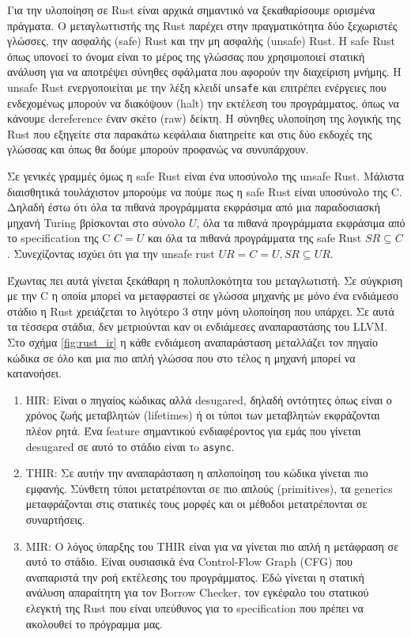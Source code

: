
Για την υλοποίηση σε Rust είναι αρχικά σημαντικό να ξεκαθαρίσουμε ορισμένα
πράγματα. Ο μεταγλωττιστής της Rust παρέχει στην πραγματικότητα δύο ξεχωριστές
γλώσσες, την ασφαλής (safe) Rust και την μη ασφαλής (unsafe) Rust. Η safe Rust
όπως υπονοεί το όνομα είναι το μέρος της γλώσσας που χρησιμοποιεί στατική ανάλυση
για να αποτρέψει σύνηθες σφάλματα που αφορούν την διαχείριση μνήμης. Η unsafe Rust
ενεργοποιείται με την λέξη κλειδί \verb|unsafe| και επιτρέπει ενέργειες που ενδεχομένως
μπορούν να διακόψουν (halt) την εκτέλεση του προγράμματος, όπως να κάνουμε dereference έναν
σκέτο (raw) δείκτη. Η σύνηθες υλοποίηση της λογικής της Rust που εξηγείτε στα παρακάτω κεφάλαια
διατηρείτε και στις δύο εκδοχές της γλώσσας και όπως θα δούμε μπορούν προφανώς να συνυπάρχουν.

Σε γενικές γραμμές όμως η safe Rust είναι ένα υποσύνολο της unsafe Rust. Μάλιστα διαισθητικά
τουλάχιστον μπορούμε να πούμε πως η safe Rust είναι υποσύνολο της C. Δηλαδή έστω ότι όλα τα πιθανά
προγράμματα εκφράσιμα από μια παραδοσιασκή μηχανή Turing βρίσκονται στο σύνολο $U$, όλα τα πιθανά
προγράμματα εκφράσιμα από το specification της C $C=U$ και όλα τα πιθανά προγράμματα της safe Rust $SR \subseteq C$.
Συνεχίζοντας ισχύει ότι για την unsafe rust $UR=C=U, SR \subseteq UR$. 

Έχωντας πει αυτά γίνεται ξεκάθαρη η πολυπλοκότητα του μεταγλωτιστή. Σε σύγκριση με την C η οποία 
μπορεί να μεταφραστεί σε γλώσσα μηχανής με μόνο ένα ενδιάμεσο στάδιο η Rust χρειάζεται το λιγότερο 3
στην μόνη υλοποίηση που υπάρχει. Σε αυτά τα τέσσερα στάδια, δεν μετριούνται καν οι ενδιάμεσες αναπαραστάσης
του LLVM. Στο σχήμα \ref{fig:rust_ir} η κάθε ενδιάμεση αναπαράσταση μεταλλάζει τον πηγαίο κώδικα σε όλο και
μια πιο απλή γλώσσα που στο τέλος η μηχανή μπορεί να κατανοήσει.

\begin{enumerate}
\item HIR: Είναι ο πηγαίος κώδικας αλλά desugared, δηλαδή οντότητες όπως είναι ο χρόνος
  ζωής μεταβλητών (lifetimes) ή οι τύποι των μεταβλητών εκφράζονται πλέον ρητά. Ένα
  feature σημαντικού ενδιαφέροντος για εμάς που γίνεται desugared σε αυτό το στάδιο είναι τo
  \verb|async|.
\item THIR: Σε αυτήν την αναπαράσταση η απλοποίηση του κώδικα γίνεται πιο εμφανής. Σύνθετη
  τύποι μετατρέπονται σε πιο απλούς (primitives), τα generics μεταφράζονται στις στατικές τους
  μορφές και οι μέθοδοι μετατρέπονται σε συναρτήσεις.
\item MIR: Ο λόγος ύπαρξης του THIR είναι για να γίνεται πιο απλή η μετάφραση σε αυτό το στάδιο.
  Είναι ουσιασικά ένα Control-Flow Graph (CFG) που αναπαριστά την ροή εκτέλεσης του προγράμματος.
  Εδώ γίνεται η στατική ανάλυση απαραίτητη για τον Borrow Checker, τον εγκέφαλο του στατικού ελεγκτή
  της Rust που είναι υπεύθυνος για το specification που πρέπει να ακολουθεί το πρόγραμμα μας. 
\end{enumerate}

